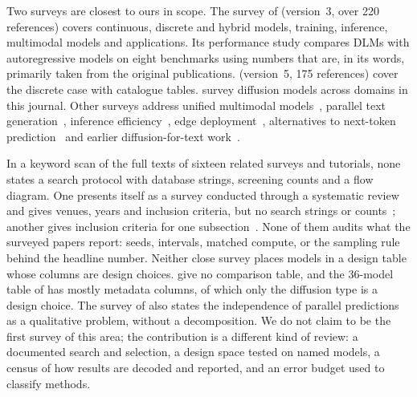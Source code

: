 Two surveys are closest to ours in scope. The survey of \citet{arXiv:2508.10875} (version~3, over 220 references) covers continuous, discrete and hybrid models, training, inference, multimodal models and applications. Its performance study compares DLMs with autoregressive models on eight benchmarks using numbers that are, in its words, primarily taken from the original publications. %
\citet{arXiv:2506.13759} (version~5, 175 references) cover the discrete case with catalogue tables. %
\citet{yang2023diffusion} survey diffusion models across domains in this journal. Other surveys address unified multimodal models~\cite{arXiv:2505.02567,arXiv:2409.14993,arXiv:2605.25343}, parallel text generation~\cite{arXiv:2508.08712}, inference efficiency~\cite{arXiv:2607.12829}, edge deployment~\cite{arXiv:2609.04778}, alternatives to next-token prediction~\cite{arXiv:2509.24435} and earlier diffusion-for-text work~\cite{arXiv:2303.06574}.

In a keyword scan of the full texts of sixteen related surveys and tutorials, none states a search protocol with database strings, screening counts and a flow diagram. %
One presents itself as a survey conducted through a systematic review and gives venues, years and inclusion criteria, but no search strings or counts~\cite{arXiv:2509.24435}; another gives inclusion criteria for one subsection~\cite{arXiv:2508.08712}. %
None of them audits what the surveyed papers report: seeds, intervals, matched compute, or the sampling rule behind the headline number. %
Neither close survey places models in a design table whose columns are design choices. \citet{arXiv:2506.13759} give no comparison table, and the 36-model table of \citet{arXiv:2508.10875} has mostly metadata columns, of which only the diffusion type is a design choice. %
The survey of \citet{arXiv:2508.10875} also states the independence of parallel predictions as a qualitative problem, without a decomposition. %
We do not claim to be the first survey of this area; the contribution is a different kind of review: a documented search and selection, a design space tested on named models, a census of how results are decoded and reported, and an error budget used to classify methods.

